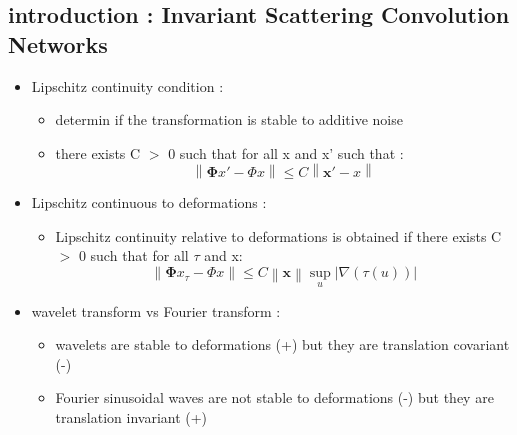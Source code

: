 \documentclass{beamer}
\begin{document}
\subsection{introduction : Invariant Scattering Convolution Networks}

\begin{frame}
\begin{itemize}
    
    \item Lipschitz continuity condition :
    \begin{itemize}
        \item determin if the transformation is stable to additive noise
        \item there exists C $>$ 0 such that for all x and x' such that : 
        \begin{equation}
             \left\|\mathbf \Phi x' - \Phi x \right\| \leq C \left\|\mathbf x' - x \right\|
        \end{equation}
    \end{itemize}
    
    \item Lipschitz continuous to deformations :
    \begin{itemize}
        \item Lipschitz continuity relative to deformations is obtained if there exists C $>$ 0 such that for all $\tau$ and x:
        \begin{equation}
             \left\|\mathbf \Phi x_{\tau} - \Phi x \right\| \leq C \left\|\mathbf x \right\| \sup_{u} \lvert \nabla (\tau(u)) \rvert
        \end{equation}
    \end{itemize}


	
\end{itemize}
\end{frame}

\begin{frame}
\begin{itemize}
	\item  wavelet transform vs Fourier transform :
	\begin{itemize}
	    \item wavelets are stable to deformations (+) but they are translation covariant (-)
	    \item Fourier sinusoidal waves are not stable to deformations (-) but they are translation invariant (+)
	\end{itemize}

\end{itemize}
\end{frame}
\end{document}
